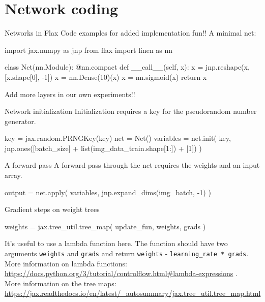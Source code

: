 \documentclass{beamer}
\begin{document}
    \section{Network coding}
    \begin{frame}[fragile]{Networks in Flax}
      Code examples for added implementation fun!! A minimal net:
      \begin{python}
      import jax.numpy as jnp
      from flax import linen as nn

      class Net(nn.Module):
      @nn.compact
      def __call__(self, x):
          x = jnp.reshape(x,
              [x.shape[0], -1])
          x = nn.Dense(10)(x)
          x = nn.sigmoid(x)
          return x
      \end{python}
      Add more layers in our own experiments!!
    \end{frame}

    \begin{frame}[fragile]{Network initialization}
      Initialization requires a key for the pseudorandom number generator.
      \begin{python}
      key = jax.random.PRNGKey(key)
      net = Net()
      variables = net.init(
          key, jnp.ones([batch_size]
          + list(img_data_train.shape[1:])
          + [1])
      )
      \end{python} 
    \end{frame}

    \begin{frame}[fragile]{A forward pass}
      A forward pass through the net requires the weights and an input array.
      \begin{python}
      output = net.apply(
        variables,
        jnp.expand_dims(img_batch, -1)
      )
      \end{python}
    \end{frame}

    \begin{frame}[fragile]{Gradient steps on weight trees} 
      \begin{python}
      weights = jax.tree_util.tree_map(
          update_fun,
          weights, grads
      )
      \end{python} 
      It's useful to use a lambda function here.
      The function should have two arguments \texttt{weights} and \texttt{grads} and return
      \texttt{weights} - \texttt{learning\_rate * grads}. \\
      More information on lambda functions: \\
      \url{https://docs.python.org/3/tutorial/controlflow.html#lambda-expressions} . \\
      More information on the tree maps: \\
      \url{https://jax.readthedocs.io/en/latest/_autosummary/jax.tree_util.tree_map.html}
    \end{frame}
\end{document}
